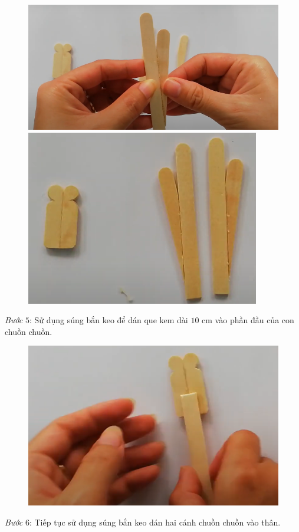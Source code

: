 \begin{multicols}{2}
\begin{figure}[H]
		\vspace*{1pt}
		\includegraphics[width=0.7\linewidth]{53}
		
		\vspace*{1pt}
		\includegraphics[width=0.7\linewidth]{54}
		\vspace*{-10pt}
	\end{figure}
	\textit{Bước} $5$: Sử dụng súng bắn keo để dán que kem dài $10$ cm vào phần đầu của con chuồn chuồn.
	\begin{figure}[H]
		\vspace*{-5pt}
		\centering
		\captionsetup{labelformat= empty, justification=centering}
		\includegraphics[width=0.7\linewidth]{55}
		\vspace*{-10pt}
	\end{figure}
	\textit{Bước} $6$: Tiếp tục sử dụng súng bắn keo dán hai cánh chuồn chuồn vào thân.

\end{multicols}
